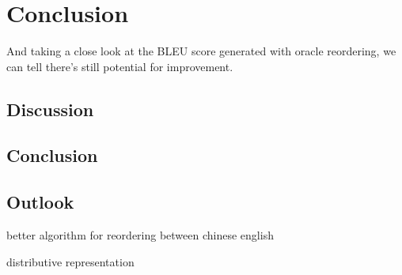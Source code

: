 

\chapter{Conclusion}
\label{ch:Conclusion}
And taking a close look at the BLEU score generated with oracle reordering, we can tell there's still potential for improvement.

\section{Discussion}
\label{ch:Conclusion:sec:Discussion}


\section{Conclusion}
\label{ch:Conclusion:sec:Conclusion}


\section{Outlook}
\label{ch:Conclusion:sec:Outlook}

better algorithm for reordering between chinese english

distributive representation